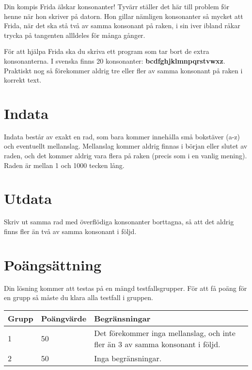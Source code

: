 Din kompis Frida älskar konsonanter! Tyvärr ställer det här till problem för henne när hon skriver på datorn. Hon gillar nämligen konsonanter så mycket att Frida, när det ska stå två av samma konsonant på raken, i sin iver ibland råkar trycka på tangenten allldeles för många gånger.

För att hjälpa Frida ska du skriva ett program som tar bort de extra konsonanterna. I svenska finns 20 konsonanter: \textbf{bcdfghjklmnpqrstvwxz}. Praktiskt nog så förekommer aldrig tre eller fler av samma konsonant på raken i korrekt text.

\section*{Indata}
Indata består av exakt en rad, som bara kommer innehålla små bokstäver (a-z) och eventuellt mellanslag. Mellanslag kommer aldrig finnas i början eller slutet av raden, och det kommer aldrig vara flera på raken (precis som i en vanlig mening). Raden är mellan 1 och 1000 tecken lång.

\section*{Utdata}
Skriv ut samma rad med överflödiga konsonanter borttagna, så att det aldrig finns fler än två av samma konsonant i följd.

\section*{Poängsättning}
Din lösning kommer att testas på en mängd testfallsgrupper.
För att få poäng för en grupp så måste du klara alla testfall i gruppen.

\noindent
\begin{tabular}{| l | l | l |}
\hline
Grupp & Poängvärde & Begränsningar \\ \hline
1     & 50          &  Det förekommer inga mellanslag, och inte fler än 3 av samma konsonant i följd.\\ \hline
2     & 50         &  Inga begränsningar. \\ \hline
\end{tabular}

